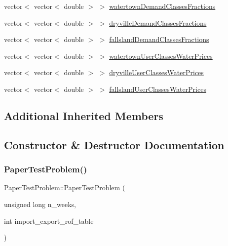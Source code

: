 \begin{DoxyCompactItemize}
\item 
vector$<$ vector$<$ double $>$ $>$ \mbox{\hyperlink{classPaperTestProblem_a7808c1a9863d8188e4aa66cfd485ef0a_a7808c1a9863d8188e4aa66cfd485ef0a}{watertown\+Demand\+Classes\+Fractions}}
\item 
vector$<$ vector$<$ double $>$ $>$ \mbox{\hyperlink{classPaperTestProblem_a3a8dfe7b057844b686eeb3bd4ad30c4b_a3a8dfe7b057844b686eeb3bd4ad30c4b}{dryville\+Demand\+Classes\+Fractions}}
\item 
vector$<$ vector$<$ double $>$ $>$ \mbox{\hyperlink{classPaperTestProblem_a506bdb234395692f92fe0f7fee088c60_a506bdb234395692f92fe0f7fee088c60}{fallsland\+Demand\+Classes\+Fractions}}
\item 
vector$<$ vector$<$ double $>$ $>$ \mbox{\hyperlink{classPaperTestProblem_a615952a6a9f19f58361037810a4d5903_a615952a6a9f19f58361037810a4d5903}{watertown\+User\+Classes\+Water\+Prices}}
\item 
vector$<$ vector$<$ double $>$ $>$ \mbox{\hyperlink{classPaperTestProblem_a2007d9d8030d96bf2147505265db4540_a2007d9d8030d96bf2147505265db4540}{dryville\+User\+Classes\+Water\+Prices}}
\item 
vector$<$ vector$<$ double $>$ $>$ \mbox{\hyperlink{classPaperTestProblem_acd8ca29e3e165f9008ee6be50e46b253_acd8ca29e3e165f9008ee6be50e46b253}{fallsland\+User\+Classes\+Water\+Prices}}
\end{DoxyCompactItemize}
\subsection*{Additional Inherited Members}


\subsection{Constructor \& Destructor Documentation}
\mbox{\label{classPaperTestProblem_acc053a5b4515f3959494ce58c763d582_acc053a5b4515f3959494ce58c763d582}} 
\subsubsection{\texorpdfstring{Paper\+Test\+Problem()}{PaperTestProblem()}}
{\footnotesize\ttfamily Paper\+Test\+Problem\+::\+Paper\+Test\+Problem (\begin{DoxyParamCaption}\item[{unsigned long}]{n\+\_\+weeks,  }\item[{int}]{import\+\_\+export\+\_\+rof\+\_\+table }\end{DoxyParamCaption})}

